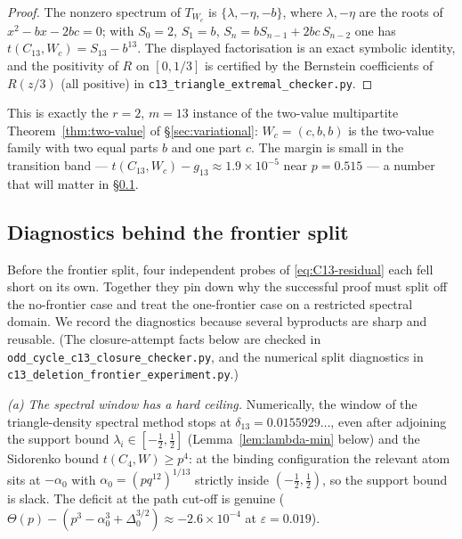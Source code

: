 \documentclass[11pt]{article}
\newcommand{\eps}{\varepsilon}
\begin{document}
\begin{proof}
The nonzero spectrum of $T_{W_c}$ is $\{\lambda,-\eta,-b\}$, where $\lambda,-\eta$ are the roots of $x^2-bx-2bc=0$; with $S_0=2$, $S_1=b$, $S_n=bS_{n-1}+2bc\,S_{n-2}$ one has $t(C_{13},W_c)=S_{13}-b^{13}$.  The displayed factorisation is an exact symbolic identity, and the positivity of $R$ on $[0,1/3]$ is certified by the Bernstein coefficients of $R(z/3)$ (all positive) in \texttt{c13\_triangle\_extremal\_checker.py}.
\end{proof}

This is exactly the $r=2$, $m=13$ instance of the two-value multipartite Theorem~\ref{thm:two-value} of \S\ref{sec:variational}: $W_c=(c,b,b)$ is the two-value family with two equal parts $b$ and one part $c$.  The margin is small in the transition band --- $t(C_{13},W_c)-g_{13}\approx1.9\times10^{-5}$ near $p=0.515$ --- a number that will matter in \S\ref{subsec:C13-attempt}.

\subsection{Diagnostics behind the frontier split}\label{subsec:C13-attempt}

Before the frontier split, four independent probes of \eqref{eq:C13-residual} each fell short on its own.  Together they pin down why the successful proof must split off the no-frontier case and treat the one-frontier case on a restricted spectral domain.  We record the diagnostics because several byproducts are sharp and reusable.  (The closure-attempt facts below are checked in \texttt{odd\_cycle\_c13\_closure\_checker.py}, and the numerical split diagnostics in \texttt{c13\_deletion\_frontier\_experiment.py}.)

\emph{(a) The spectral window has a hard ceiling.}  Numerically, the window of the triangle-density spectral method stops at $\delta_{13}=0.0155929\ldots$, even after adjoining the support bound $\lambda_i\in[-\tfrac12,\tfrac12]$ (Lemma~\ref{lem:lambda-min} below) and the Sidorenko bound $t(C_4,W)\ge p^4$: at the binding configuration the relevant atom sits at $-\alpha_0$ with $\alpha_0=(pq^{12})^{1/13}$ strictly inside $(-\tfrac12,\tfrac12)$, so the support bound is slack.  The deficit at the path cut-off is genuine ($\Theta(p)-(p^3-\alpha_0^3+\Delta_0^{3/2})\approx-2.6\times10^{-4}$ at $\eps=0.019$).
\end{document}
